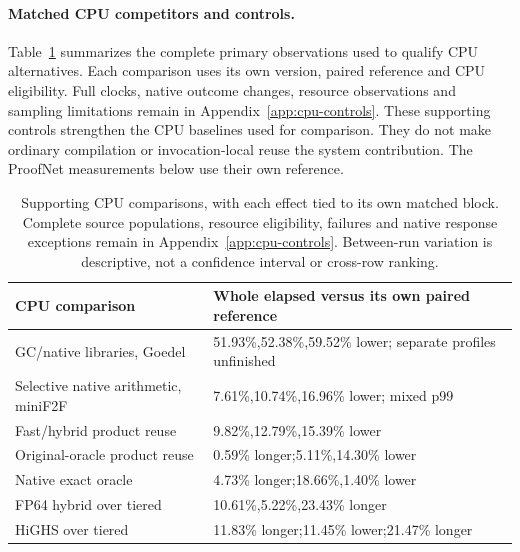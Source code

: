 \documentclass[10pt,twocolumn]{article}
\begin{document}
\paragraph{Matched CPU competitors and controls.}
Table~\ref{tab:cpu-control-summary} summarizes the complete primary observations
used to qualify CPU alternatives. Each comparison uses its own version,
paired reference and CPU eligibility. Full clocks, native outcome changes,
resource observations and sampling limitations remain in
Appendix~\ref{app:cpu-controls}. These supporting controls strengthen the
CPU baselines used for comparison. They do not make ordinary compilation or invocation-local reuse
the system contribution. The ProofNet measurements below use their own reference.

\begin{table}[t]
\centering
\small
\begin{tabular}{@{}p{}p{}@{}}
\toprule
CPU comparison & Whole elapsed versus its own paired reference \\
\midrule
GC/native libraries, Goedel & 51.93\%,52.38\%,59.52\% lower; separate profiles unfinished \\
Selective native arithmetic, miniF2F & 7.61\%,10.74\%,16.96\% lower; mixed p99 \\
Fast/hybrid product reuse & 9.82\%,12.79\%,15.39\% lower \\
Original-oracle product reuse & 0.59\% longer;5.11\%,14.30\% lower \\
Native exact oracle & 4.73\% longer;18.66\%,1.40\% lower \\
FP64 hybrid over tiered & 10.61\%,5.22\%,23.43\% longer \\
HiGHS over tiered & 11.83\% longer;11.45\% lower;21.47\% longer \\
\bottomrule
\end{tabular}
\caption{Supporting CPU comparisons, with each effect tied to its own matched
block. Complete source populations, resource eligibility, failures and native
response exceptions remain in Appendix~\ref{app:cpu-controls}. Between-run
variation is descriptive, not a confidence interval or cross-row ranking.}
\label{tab:cpu-control-summary}
\end{table}
\end{document}
